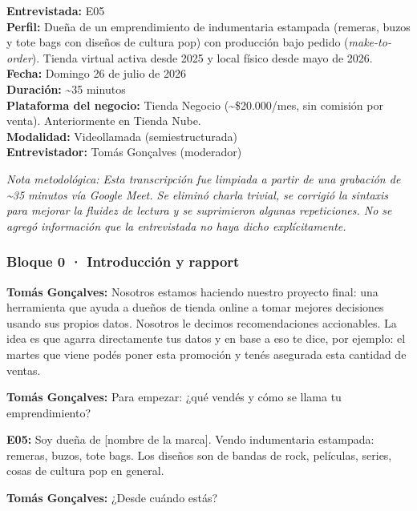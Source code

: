﻿
\noindent\textbf{Entrevistada:} E05\\
\noindent\textbf{Perfil:} Dueña de un emprendimiento de indumentaria estampada (remeras, buzos y tote bags con diseños de cultura pop) con producción bajo pedido (\textit{make-to-order}). Tienda virtual activa desde 2025 y local físico desde mayo de 2026.\\
\noindent\textbf{Fecha:} Domingo 26 de julio de 2026\\
\noindent\textbf{Duración:} \textasciitilde35 minutos\\
\noindent\textbf{Plataforma del negocio:} Tienda Negocio (\textasciitilde\$20.000/mes, sin comisión por venta). Anteriormente en Tienda Nube.\\
\noindent\textbf{Modalidad:} Videollamada (semiestructurada)\\
\noindent\textbf{Entrevistador:} Tomás Gonçalves (moderador)

\begin{framed}
\small\noindent\textit{Nota metodológica: Esta transcripción fue limpiada a partir de una grabación de \textasciitilde35 minutos vía Google Meet. Se eliminó charla trivial, se corrigió la sintaxis para mejorar la fluidez de lectura y se suprimieron algunas repeticiones. No se agregó información que la entrevistada no haya dicho explícitamente.}
\end{framed}

\subsubsection*{Bloque 0 · Introducción y rapport}

\noindent\textbf{Tomás Gonçalves:} Nosotros estamos haciendo nuestro proyecto final: una herramienta que ayuda a dueños de tienda online a tomar mejores decisiones usando sus propios datos. Nosotros le decimos recomendaciones accionables. La idea es que agarra directamente tus datos y en base a eso te dice, por ejemplo: el martes que viene podés poner esta promoción y tenés asegurada esta cantidad de ventas.

\noindent\textbf{Tomás Gonçalves:} Para empezar: ¿qué vendés y cómo se llama tu emprendimiento?

\noindent\textbf{E05:} Soy dueña de [nombre de la marca]. Vendo indumentaria estampada: remeras, buzos, tote bags. Los diseños son de bandas de rock, películas, series, cosas de cultura pop en general.

\noindent\textbf{Tomás Gonçalves:} ¿Desde cuándo estás?

